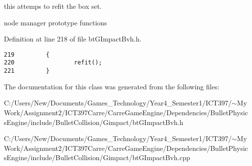 this attemps to refit the box set. 

node manager prototype functions 

Definition at line 218 of file btGImpactBvh.h.

\begin{Code}\begin{verbatim}219         {
220                 refit();
221         }
\end{verbatim}
\end{Code}




The documentation for this class was generated from the following files:\begin{CompactItemize}
\item 
C:/Users/New/Documents/Games\_\-Technology/Year4\_\-Semester1/ICT397/$\sim$My Work/Assignment2/ICT397Carre/CarreGameEngine/Dependencies/BulletPhysicsEngine/include/BulletCollision/Gimpact/btGImpactBvh.h\item 
C:/Users/New/Documents/Games\_\-Technology/Year4\_\-Semester1/ICT397/$\sim$My Work/Assignment2/ICT397Carre/CarreGameEngine/Dependencies/BulletPhysicsEngine/include/BulletCollision/Gimpact/btGImpactBvh.cpp\end{CompactItemize}
